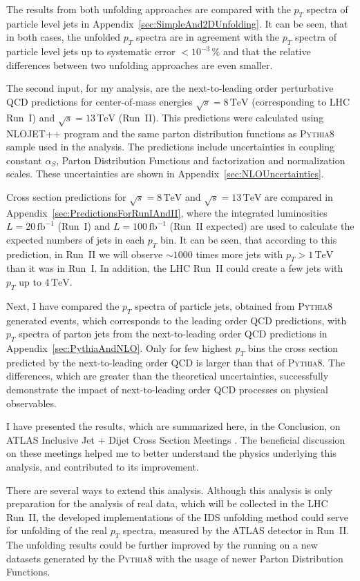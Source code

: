 \documentclass[a4paper,11pt,twoside,openright]{book}
\newcommand{\TeV}{\,\text{TeV}}
\newcommand{\pt}{p_{T}}
\begin{document}
The results from both unfolding approaches are compared with the $\pt$
spectra of particle level jets in Appendix~\ref{sec:SimpleAnd2DUnfolding}. It
can be seen, that in both cases, the unfolded $\pt$ spectra are in agreement
with the $\pt$ spectra of particle level jets up to systematic error $<
10^{-3}\,\%$ and that the relative differences between two unfolding approaches
are even smaller.

The second input, for my analysis, are the next-to-leading order perturbative QCD
predictions for center-of-mass energies $\sqrt{s}=8\TeV$ (corresponding to LHC Run~I)
and $\sqrt{s}=13\TeV$ (Run~II). This predictions were calculated 
using \textsc{NLOJET++} program and the same parton distribution functions as
\textsc{Pythia8} sample used in the analysis. The predictions
include uncertainties in coupling constant $\alpha_S$, Parton Distribution
Functions and factorization and normalization scales. These uncertainties are
shown in Appendix~\ref{sec:NLOUncertainties}.

Cross section predictions for $\sqrt{s}=8\TeV$ and $\sqrt{s}=13\TeV$ are
compared in Appendix~\ref{sec:PredictionsForRunIAndII}, where the
integrated luminosities $L=20\,\text{fb}^{-1}$ (Run~I) and
$L=100\,\text{fb}^{-1}$ (Run~II expected) are used to calculate the expected
numbers of jets in each $\pt$ bin. It
can be seen, that according to
this prediction, in Run~II we will observe $\sim 1000$ times more jets with $\pt > 1\TeV$
than it was in Run~I. In addition, the LHC Run~II could create a few jets
with $\pt$ up to $4\TeV$.

Next, I have compared the $\pt$ spectra of particle jets, obtained from
\textsc{Pythia8} generated events, which corresponds to the leading order QCD
predictions, with $\pt$ spectra of parton jets from the next-to-leading order
QCD predictions in
Appendix~\ref{sec:PythiaAndNLO}. Only for few highest $\pt$ bins the cross section
predicted by the next-to-leading order QCD is larger than that of
\textsc{Pythia8}. The differences, which are greater than the
theoretical uncertainties, successfully demonstrate the impact of
next-to-leading order QCD processes on physical observables.

I have presented the results, which are summarized here, in the Conclusion, on
ATLAS Inclusive Jet + Dijet Cross Section Meetings \cite{Prez1,Prez2}. The
beneficial discussion on these meetings helped me to better understand the
physics underlying this analysis, and contributed to its improvement.

There are several ways to extend this analysis. Although this analysis is only
preparation for the analysis of real data, which will be collected in the LHC Run~II,
the developed implementations of the IDS unfolding method could serve for
unfolding of the real $\pt$ spectra, measured by the ATLAS detector in Run~II.
The unfolding results could be further improved by the running on a new datasets
generated by the \textsc{Pythia8} with the usage of newer Parton Distribution
Functions.
\end{document}
